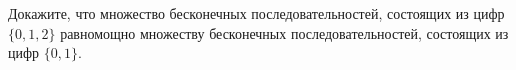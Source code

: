 Докажите, что множество бесконечных последовательностей, состоящих из цифр $\{0, 1, 2\}$ равномощно множеству бесконечных
последовательностей, состоящих из цифр $\{0, 1\}$.